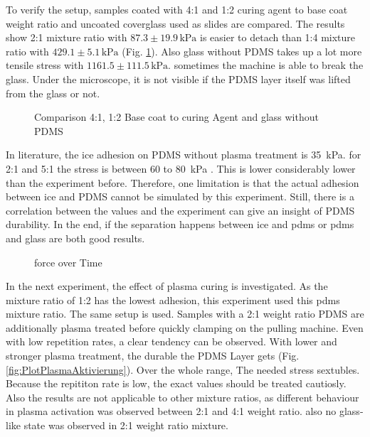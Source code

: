 To verify the setup, samples coated with 4:1 and 1:2 curing agent to base coat weight ratio and uncoated coverglass used as slides are compared. The results show 2:1 mixture ratio with $87.3\pm19.9\,\si{\kilo\pascal}$ is easier to detach than 1:4 mixture ratio with $429.1\pm5.1\,\si{\kilo\pascal}$ (Fig. \ref{fig:vgl4:1zu1:2zuGlas}). Also glass without PDMS takes up a lot more tensile stress with $1161.5\pm111.5\,\si{\kilo\pascal}$. sometimes the machine is able to break the glass. Under the microscope, it is not visible if the PDMS layer itself was lifted from the glass or not.

\begin{figure}[hbt!]
	\centering	
	
	\caption{Comparison 4:1, 1:2 Base coat to curing Agent and glass without PDMS}
	\label{fig:vgl4:1zu1:2zuGlas}
\end{figure}

In literature, the ice adhesion on PDMS without plasma treatment is \SI{35}{\kilo\pascal}. for 2:1 and 5:1 the stress is between $60$ to \SI{80}{\kilo\pascal} \cite{IbanezIbanez.2022}. This is lower considerably lower than the experiment before. Therefore, one limitation is that the actual adhesion between ice and PDMS cannot be simulated by this experiment. Still, there is a correlation between the values and the experiment can give an insight of PDMS durability. In the end, if the separation happens between ice and pdms or pdms and glass are both good results. 

\begin{figure}[hbt!]
	\centering
	
	\caption{force over Time}
\end{figure}

In the next experiment, the effect of plasma curing is investigated. As the mixture ratio of 1:2 has the lowest adhesion, this experiment used this pdms mixture ratio. The same setup is used. Samples with a 2:1 weight ratio PDMS are additionally plasma treated before quickly clamping on the pulling machine. Even with low repetition rates, a clear tendency can be observed. With lower and stronger plasma treatment, the durable the PDMS Layer gets (Fig. \ref{fig:PlotPlasmaAktivierung}). Over the whole range, The needed stress sextubles. Because the repititon rate is low, the exact values should be treated cautiosly. Also the results are not applicable to other mixture ratios, as different behaviour in plasma activation was observed between 2:1 and 4:1 weight ratio. also no glass-like state was observed in 2:1 weight ratio mixture.


